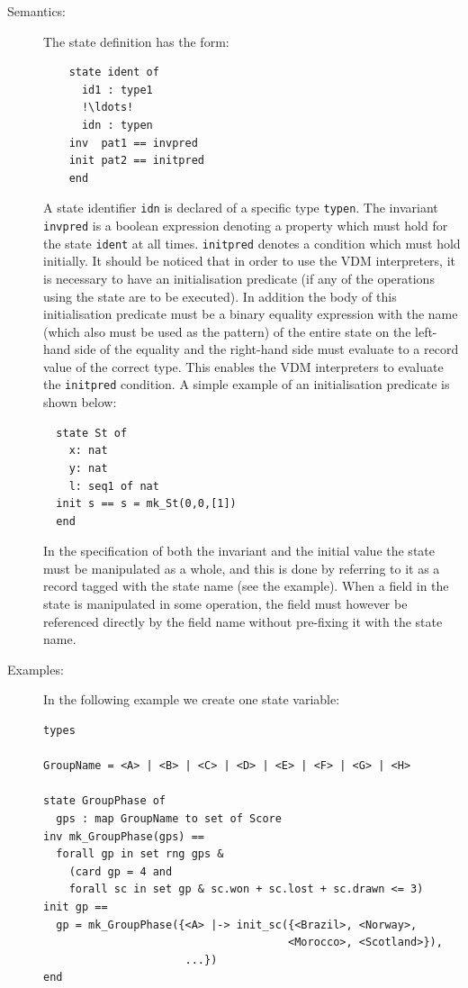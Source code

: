 \documentclass{overturerepchap}
\begin{document}
{\begin{description}
\item[Semantics:] The state definition has the form:
  \begin{lstlisting}
    state ident of
      id1 : type1
      !\ldots!
      idn : typen
    inv  pat1 == invpred
    init pat2 == initpred
    end
  \end{lstlisting}
  A state identifier {\tt idn} is declared of a specific type {\tt typen}.
  The invariant {\tt invpred} is a boolean expression denoting a
  property which must hold for the state {\tt ident} at all
  times. {\tt initpred} denotes a condition which must hold initially.
  It should be noticed that in order to use the
  VDM interpreters, it is
  necessary to have an initialisation predicate (if any of the
  operations using the state are to be executed). In addition the body of
  this initialisation predicate must be a binary equality expression with
  the name (which also must be used as the pattern) of the entire state on
  the left-hand side of the equality and the right-hand side must evaluate
  to a record value of the correct type. This enables the VDM interpreters
  to evaluate the {\tt initpred} condition. A simple example of an
  initialisation predicate is shown below:

  \begin{lstlisting}
  state St of
    x: nat
    y: nat
    l: seq1 of nat
  init s == s = mk_St(0,0,[1])
  end
  \end{lstlisting}

  In the specification of both the invariant and the initial value the
  state must be manipulated as a whole, and this is done by referring to it
  as a record tagged with the state name (see the example). When a field in
  the state is manipulated in some operation, the field must however be
  referenced directly by the field name without pre-fixing it with the
  state name.

\item[Examples:] In the following example we create one state variable:
  \begin{lstlisting}
types

GroupName = <A> | <B> | <C> | <D> | <E> | <F> | <G> | <H>

state GroupPhase of
  gps : map GroupName to set of Score
inv mk_GroupPhase(gps) ==
  forall gp in set rng gps &
    (card gp = 4 and
    forall sc in set gp & sc.won + sc.lost + sc.drawn <= 3)
init gp ==
  gp = mk_GroupPhase({<A> |-> init_sc({<Brazil>, <Norway>,
                                      <Morocco>, <Scotland>}),
                      ...})
end


\end{lstlisting}
\end{description}}
\end{document}
